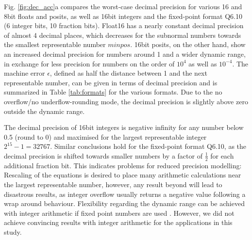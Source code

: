 \documentclass[draft]{agujournal2019}
\begin{document}
Fig. \ref{fig:dec_acc}a compares the worst-case decimal precision for various 16 and 8bit floats and posits, as well as 16bit integers and the fixed-point format Q6.10 (6 integer bits, 10 fraction bits). Float16 has a nearly constant decimal precision of almost 4 decimal places, which decreases for the subnormal numbers towards the smallest representable number $minpos$. 16bit posits, on the other hand, show an increased decimal precision for numbers around 1 and a wider dynamic range, in exchange for less precision for numbers on the order of $10^4$ as well as $10^{-4}$.  The machine error $\epsilon$, defined as half the distance between 1 and the next representable number, can be given in terms of decimal precision and is summarized in Table \ref{tab:formats} for the various formats. Due to the no overflow/no underflow-rounding mode, the decimal precision is slightly above zero outside the dynamic range. 

The decimal precision of 16bit integers is negative infinity for any number below 0.5 (round to 0) and maximised for the largest representable integer $2^{15} - 1 =  32767$. Similar conclusions hold for the fixed-point format Q6.10, as the decimal precision is shifted towards smaller numbers by a factor of $\tfrac{1}{2}$ for each additional fraction bit. This indicates problems for reduced precision modelling: Rescaling of the equations is desired to place many arithmetic calculations near the largest representable number, however, any result beyond will lead to disastrous results, as integer overflow usually returns a negative value following a wrap around behaviour. Flexibility regarding the dynamic range can be achieved with integer arithmetic if fixed point numbers are used \cite{Russell2017}. However, we did not achieve convincing results with integer arithmetic for the applications in this study.
\end{document}
